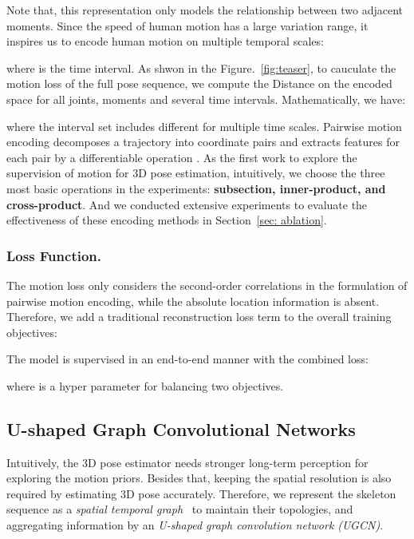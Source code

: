 \documentclass[runningheads]{llncs}
\begin{document}
Note that, this representation only models the relationship between two adjacent moments.
Since the speed of human motion has a large variation range,
it inspires us to encode human motion on multiple temporal scales:

where  is the time interval. As shwon in the Figure.~\ref{fig:teaser}, to cauculate the motion loss of the full pose sequence, we compute the  Distance on the encoded space for all joints, moments and several time intervals. Mathematically, we have:

where the interval set  includes different  for multiple time scales.
Pairwise motion encoding decomposes a trajectory into coordinate pairs and extracts features for each pair by a differentiable operation .
As the first work to explore the supervision of motion for 3D pose estimation, intuitively, we choose the three most basic operations in the experiments: \textbf{subsection, inner-product, and cross-product}. And we conducted extensive experiments to evaluate the effectiveness of these encoding methods in Section~\ref{sec: ablation}.


\subsubsection{Loss Function.}
The motion loss only considers the second-order correlations in the formulation of pairwise motion encoding, while the absolute location information is absent.
Therefore, we add a traditional reconstruction loss term to the overall training objectives:

The model is supervised in an end-to-end manner with the combined loss:
 
where  is a hyper parameter for balancing two objectives.



\subsection{U-shaped Graph Convolutional Networks}
Intuitively, the 3D pose estimator needs stronger long-term perception
for exploring the motion priors.
Besides that, keeping the spatial resolution is also required by estimating 3D pose accurately.
Therefore,
we represent the skeleton sequence as a \textit{spatial temporal graph}~\cite{yan2018spatial} to maintain their topologies,
and aggregating information by an \textit{U-shaped graph convolution network (UGCN)}.
\end{document}
